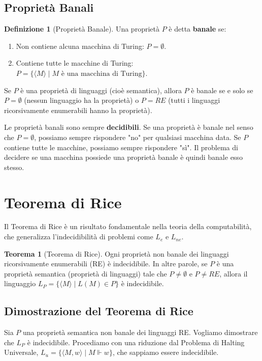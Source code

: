 \documentclass[a4paper]{article}
\theoremstyle{definition} %
\newtheorem{theorem}{Teorema}
\newtheorem{definition}{Definizione}
\begin{document}
\subsection{Proprietà Banali}

\begin{definition}[Proprietà Banale]
Una proprietà $P$ è detta \textbf{banale} se:
\begin{enumerate}
    \item Non contiene alcuna macchina di Turing: $P = \emptyset$.
    \item Contiene tutte le macchine di Turing: $P = \{\langle M \rangle \mid M \text{ è una macchina di Turing}\}$.
\end{enumerate}
Se $P$ è una proprietà di linguaggi (cioè semantica), allora $P$ è banale se e solo se $P = \emptyset$ (nessun linguaggio ha la proprietà) o $P = RE$ (tutti i linguaggi ricorsivamente enumerabili hanno la proprietà).
\end{definition}

Le proprietà banali sono sempre \textbf{decidibili}. Se una proprietà è banale nel senso che $P = \emptyset$, possiamo sempre rispondere "no" per qualsiasi macchina data. Se $P$ contiene tutte le macchine, possiamo sempre rispondere "sì". Il problema di decidere se una macchina possiede una proprietà banale è quindi banale esso stesso.

\section{Teorema di Rice}

Il Teorema di Rice è un risultato fondamentale nella teoria della computabilità, che generalizza l'indecidibilità di problemi come $L_e$ e $L_{ne}$.

\begin{theorem}[Teorema di Rice]
Ogni proprietà non banale dei linguaggi ricorsivamente enumerabili (RE) è indecidibile.
In altre parole, se $P$ è una proprietà semantica (proprietà di linguaggi) tale che $P \neq \emptyset$ e $P \neq RE$, allora il linguaggio $L_P = \{\langle M \rangle \mid L(M) \in P\}$ è indecidibile.
\end{theorem}

\subsection{Dimostrazione del Teorema di Rice}
Sia $P$ una proprietà semantica non banale dei linguaggi RE. Vogliamo dimostrare che $L_P$ è indecidibile. Procediamo con una riduzione dal Problema di Halting Universale, $L_u = \{\langle M,w \rangle \mid M \Vdash w\}$, che sappiamo essere indecidibile.
\end{document}
